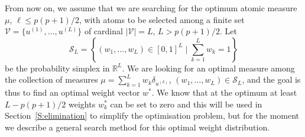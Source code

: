 \documentclass[a4paper]{article}
\newcommand{\LP}[1]{{\textcolor{purple}{[LP: \textit{#1}]}}}
\newcommand{\Luc}{\color{magenta} }
\theoremstyle{definition}
\theoremstyle{remark}
\newtheorem{remark}[theorem]{Remark}
\newcommand{\R}{\mathbb{R}}
\newcommand{\V}{\mathcal{V}}
\newcommand{\Mb}{\mathbf{M}}
\renewcommand{\S}{\mathcal{S}}
\begin{document}




From now on, we assume that we are searching for the optimum atomic measure $\mu$, $\ell\leq p(p+1)/2$, with atoms to be selected among a finite set  $\V=\{u^{(1)}, \dots ,u^{(L)}\}$ of cardinal $|\V|=L$, $L>p(p+1)/2$.
Let
$$
\S_L=\left\{
(w_1,\dots, w_L)\in [0,1]^L
\mid 
\sum_{k=1}^L w_k=1 
\right\}
$$ 
be the 
probability
simplex in $\R^L$. %
We are looking for an optimal measure among the collection of measures $\mu=\sum_{k=1}^L w_k\delta_{u^{(k)}}$, $(w_1,\dots, w_L)\in \S_L$, and the goal is thus to find an optimal weight vector $w^*$.
{\Luc We know that at the optimum at least $L-p(p+1)/2$ weights $w_k^*$ can be set to zero and this will be used in Section~\ref{S:elimination} to simplify the optimisation problem, but for the moment we describe a general search method for this optimal weight distribution}.
\end{document}
